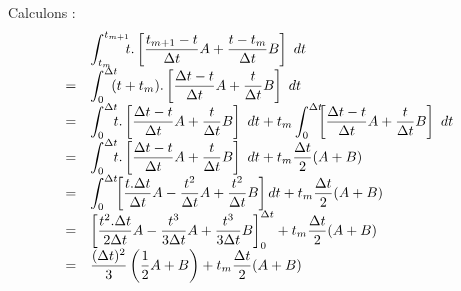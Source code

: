 \documentclass[12pt,a4paper]{report}
\begin{document}
Calculons :
\begin{equation}
\begin{array}{r l}
&\displaystyle\int_{t_m}^{t_{m+1}} \!\!\! 	
	t.\left[
		\frac{t_{m+1}-t}{\Delta t} A + 
		\frac{t-t_m}{\Delta t} B 
	\right] ~dt
\\ =&\displaystyle
	\int_{0}^{\Delta t} \!\!\! 	
		(t+t_m).\left[
			\frac{\Delta t-t}{\Delta t} A + 
			\frac{t}{\Delta t} B 
		\right] ~dt
\\ =&\displaystyle
	\int_{0}^{\Delta t} \!\!\! 	
		t.\left[
			\frac{\Delta t-t}{\Delta t} A + 
			\frac{t}{\Delta t} B 
		\right] ~dt
	+t_m\int_{0}^{\Delta t} \!\!\! 	
		\left[
			\frac{\Delta t-t}{\Delta t} A + 
			\frac{t}{\Delta t} B 
		\right] ~dt
\\ =&\displaystyle
	\int_{0}^{\Delta t} \!\!\! 	
		t.\left[
			\frac{\Delta t-t}{\Delta t} A + 
			\frac{t}{\Delta t} B 
		\right] ~dt
	+t_m \frac{\Delta t}{2} (A+B)
\\ =&\displaystyle
	\int_{0}^{\Delta t} \!\! 	
		\left[
			\frac{t.\Delta t}{\Delta t} A -
			\frac{t^2}{\Delta t} A + 
			\frac{t^2}{\Delta t} B 
		\right] dt
	+t_m \frac{\Delta t}{2} (A+B)
\\ =&\displaystyle
		\left[
			\frac{t^2.\Delta t}{2\Delta t} A -
			\frac{t^3}{3\Delta t} A + 
			\frac{t^3}{3\Delta t} B 
		\right]_{0}^{\Delta t} 
	+t_m \frac{\Delta t}{2} (A+B)
\\ =&\displaystyle
		\frac{(\Delta t)^2}{3}\left(
			\frac{1}{2} A + B 
		\right)
	+t_m \frac{\Delta t}{2} (A+B)
\end{array}
\end{equation}
\end{document}
